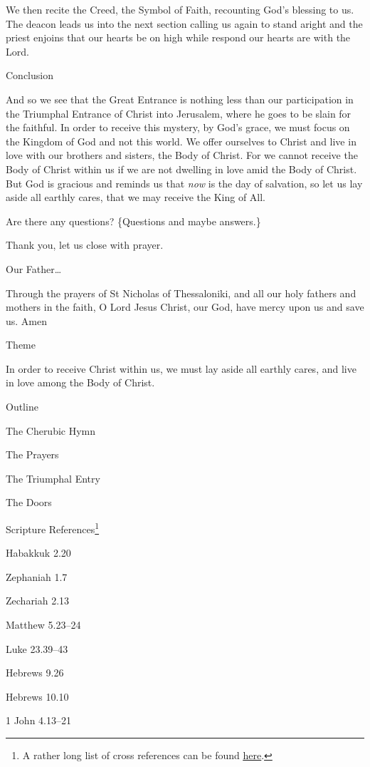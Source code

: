 \documentclass[
]{article}
\begin{document}
We then recite the Creed, the Symbol of Faith, recounting God's blessing
to us. The deacon leads us into the next section calling us again to
stand aright and the priest enjoins that our hearts be on high while
respond our hearts are with the Lord.

Conclusion

And so we see that the Great Entrance is nothing less than our
participation in the Triumphal Entrance of Christ into Jerusalem, where
he goes to be slain for the faithful. In order to receive this mystery,
by God's grace, we must focus on the Kingdom of God and not this world.
We offer ourselves to Christ and live in love with our brothers and
sisters, the Body of Christ. For we cannot receive the Body of Christ
within us if we are not dwelling in love amid the Body of Christ. But
God is gracious and reminds us that \emph{now} is the day of salvation,
so let us lay aside all earthly cares, that we may receive the King of
All.

Are there any questions? \{Questions and maybe answers.\}

Thank you, let us close with prayer.

Our Father\ldots{}

Through the prayers of St Nicholas of Thessaloniki, and all our holy
fathers and mothers in the faith, O Lord Jesus Christ, our God, have
mercy upon us and save us. Amen

Theme

In order to receive Christ within us, we must lay aside all earthly
cares, and live in love among the Body of Christ.

Outline

The Cherubic Hymn

The Prayers

The Triumphal Entry

The Doors

Scripture References\footnote{A rather long list of cross references can
  be found
  \href{http://jimmyakin.com/deuterocanonical-references-in-the-new-testament}{\ul{here}}.}

Habakkuk 2.20

Zephaniah 1.7

Zechariah 2.13

Matthew 5.23--24

Luke 23.39--43

Hebrews 9.26

Hebrews 10.10

1 John 4.13--21
\end{document}
